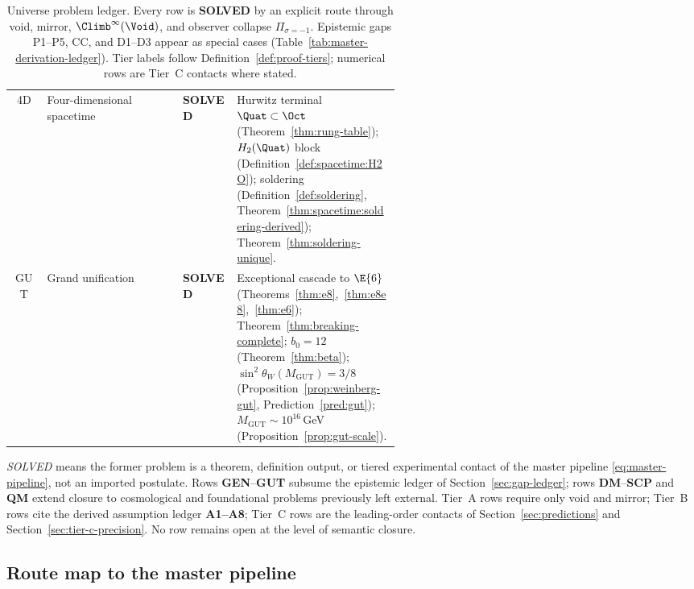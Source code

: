 \begin{table}[ht]
\begin{tabular}{@{}clp{0.14\linewidth}p{0.42\linewidth}@{}}
4D &
  Four-dimensional spacetime &
  \textbf{SOLVED} &
  Hurwitz terminal $\Quat\subset\Oct$ (Theorem~\ref{thm:rung-table});
  $H_2(\Quat)$ block (Definition~\ref{def:spacetime:H2O});
  soldering (Definition~\ref{def:soldering},
  Theorem~\ref{thm:spacetime:soldering-derived});
  Theorem~\ref{thm:soldering-unique}. \\
\addlinespace
GUT &
  Grand unification &
  \textbf{SOLVED} &
  Exceptional cascade to $\E{6}$
  (Theorems~\ref{thm:e8},~\ref{thm:e8e8},~\ref{thm:e6});
  Theorem~\ref{thm:breaking-complete};
  $b_0=12$ (Theorem~\ref{thm:beta});
  $\sin^2\theta_W(M_{\mathrm{GUT}})=3/8$
  (Proposition~\ref{prop:weinberg-gut}, Prediction~\ref{pred:gut});
  $M_{\mathrm{GUT}}\sim 10^{16}$\,GeV (Proposition~\ref{prop:gut-scale}). \\
\bottomrule
\end{tabular}
\caption{Universe problem ledger. Every row is \textbf{SOLVED} by an explicit
route through void, mirror, $\Climb^\infty(\Void)$, and observer collapse
$\Pi_{\sigma=-1}$. Epistemic gaps P1--P5, CC, and D1--D3 appear as special
cases (Table~\ref{tab:master-derivation-ledger}). Tier labels follow
Definition~\ref{def:proof-tiers}; numerical rows are Tier~C contacts where
stated.}
\label{tab:universe-problems}
\end{table}

\begin{remark}
\emph{SOLVED} means the former problem is a theorem, definition output, or
tiered experimental contact of the master pipeline \eqref{eq:master-pipeline},
not an imported postulate. Rows \textbf{GEN}--\textbf{GUT} subsume the
epistemic ledger of Section~\ref{sec:gap-ledger}; rows \textbf{DM}--\textbf{SCP}
and \textbf{QM} extend closure to cosmological and foundational problems
previously left external. Tier~A rows require only void and mirror; Tier~B rows
cite the derived assumption ledger \textbf{A1--A8}; Tier~C rows are the
leading-order contacts of Section~\ref{sec:predictions} and
Section~\ref{sec:tier-c-precision}. No row remains open at the level of
semantic closure.
\end{remark}

\subsection{Route map to the master pipeline}

